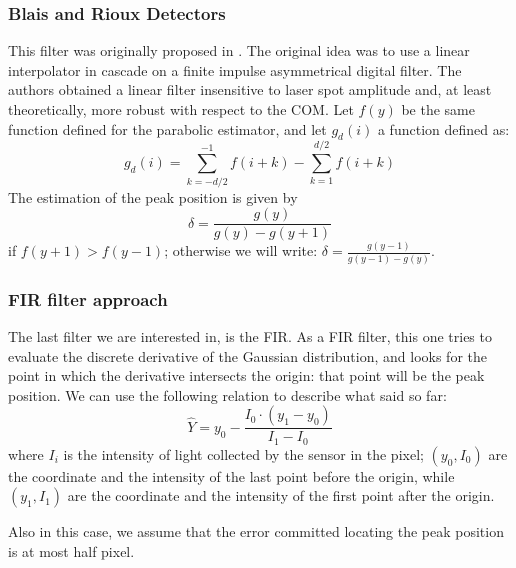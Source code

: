 \subsubsection{Blais and Rioux Detectors}
This filter was originally proposed in \cite{BLAIS1986145}. The original idea was to use a linear interpolator in cascade on a finite impulse asymmetrical digital filter. The authors obtained a linear filter insensitive to laser spot amplitude and, at least theoretically, more robust with respect to the \acs{COM}. Let $f(y)$ be the same function defined for the parabolic estimator, and let $g_d(i)$ a function defined as:
  \begin{equation*}
    g_d(i) = \sum_{k=-d/2}^{-1} f(i + k) - \sum_{k=1}^{d/2} f(i + k)
  \end{equation*}
The estimation of the peak position is given by
  \begin{equation}
      \delta = \frac{g(y)}{g(y) - g(y+1)} 
    \label{eq:sp-br}
  \end{equation}
if $f(y+1) > f(y-1)$; otherwise we will write: $\delta = \frac{g(y-1)}{g(y-1) - g(y)}$.
  
\subsubsection{FIR filter approach}
The last filter we are interested in, is the FIR. As a FIR filter, this one tries to evaluate the discrete derivative of the Gaussian distribution, and looks for the point in which the derivative intersects the origin: that point will be the peak position. We can use the following relation to describe what said so far:
  \begin{equation}
    \hat{Y} = y_0 - \frac{I_0 \cdot \left( y_1 - y_ 0\right)}{I_1 - I_ 0}
    \label{eq:sp-fir}
  \end{equation}
where $I_i$ is the intensity of light collected by the sensor in the pixel; $(y_0, I_0)$ are the coordinate and the intensity of the last point before the origin, while $(y_1, I_1)$ are the coordinate and the intensity of the first point after the origin.

Also in this case, we assume that the error committed locating the peak position is at most half pixel. \\

